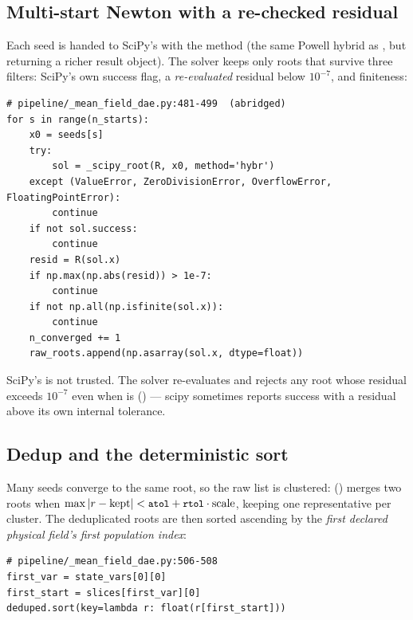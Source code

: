\subsection{Multi-start Newton with a re-checked residual}

Each seed is handed to SciPy's  with the  method (the same
Powell hybrid as , but returning a richer result object). The solver
keeps only roots that survive three filters: SciPy's own success flag, a
\emph{re-evaluated} residual below $10^{-7}$, and finiteness:

\begin{lstlisting}
# pipeline/_mean_field_dae.py:481-499  (abridged)
for s in range(n_starts):
    x0 = seeds[s]
    try:
        sol = _scipy_root(R, x0, method='hybr')
    except (ValueError, ZeroDivisionError, OverflowError, FloatingPointError):
        continue
    if not sol.success:
        continue
    resid = R(sol.x)
    if np.max(np.abs(resid)) > 1e-7:
        continue
    if not np.all(np.isfinite(sol.x)):
        continue
    n_converged += 1
    raw_roots.append(np.asarray(sol.x, dtype=float))
\end{lstlisting}

\begin{gotcha}
SciPy's  is not trusted. The solver re-evaluates 
and rejects any root whose residual exceeds $10^{-7}$ even when  is
 () --- scipy sometimes reports
success with a residual above its own internal tolerance.
\end{gotcha}

\subsection{Dedup and the deterministic sort}

Many seeds converge to the same root, so the raw list is clustered:
 () merges two roots when
$\max|r - \text{kept}| < \texttt{\small atol} + \texttt{\small rtol}\cdot\text{scale}$, keeping one
representative per cluster. The deduplicated roots are then sorted ascending by
the \emph{first declared physical field's first population index}:

\begin{lstlisting}
# pipeline/_mean_field_dae.py:506-508
first_var = state_vars[0][0]
first_start = slices[first_var][0]
deduped.sort(key=lambda r: float(r[first_start]))
\end{lstlisting}

